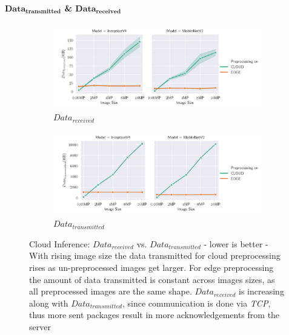 \paragraph{$\mathbf{Data_{transmitted}}$ \& $\mathbf{Data_{received}}$}
\begin{figure}[!htb]
\centering
\begin{subfigure}[b]{0.95\textwidth}
   \includegraphics[width=1\linewidth]{./Bilder/single_plots/cloud_inference_plots/Cloud_Inference_Received_Data.pdf}
   \caption{$Data_{received}$}
   \label{fig:CloudInferenceReceivedData} 
\end{subfigure}

\begin{subfigure}[b]{0.95\textwidth}
   \includegraphics[width=1\linewidth]{./Bilder/single_plots/cloud_inference_plots/Cloud_Inference_Transmitted_Data.pdf}
   \caption{$Data_{transmitted}$}
   \label{fig:CloudInferenceTransmittedData}
\end{subfigure}

\caption[Cloud Inference:  $Data_{received}$ vs. $Data_{transmitted}$ - lower is better]{Cloud Inference:  $Data_{received}$ vs. $Data_{transmitted}$ - lower is better - 
With rising image size the data transmitted for cloud preprocessing rises as un-preprocessed images get larger.
For edge preprocessing the amount of data transmitted is constant across images sizes, as all preprocessed images are the same shape.
$Data_{received}$ is increasing along with $Data_{transmitted}$, since communication is done via \emph{TCP}, thus more sent packages result in more acknowledgements from the server
}
\end{figure}

